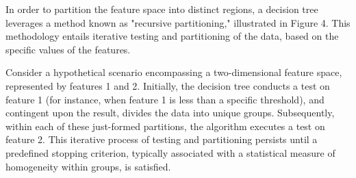 \documentclass[a4paper]{article}
\begin{document}
In order to partition the feature space into distinct regions, a decision tree leverages a method known as "recursive partitioning," illustrated in Figure 4. This methodology entails iterative testing and partitioning of the data, based on the specific values of the features.

Consider a hypothetical scenario encompassing a two-dimensional feature space, represented by features 1 and 2. Initially, the decision tree conducts a test on feature 1 (for instance, when feature 1 is less than a specific threshold), and contingent upon the result, divides the data into unique groups. Subsequently, within each of these just-formed partitions, the algorithm executes a test on feature 2. This iterative process of testing and partitioning persists until a predefined stopping criterion, typically associated with a statistical measure of homogeneity within groups, is satisfied.
\end{document}
